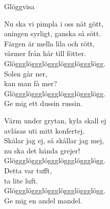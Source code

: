 \begin{song}{Glöggvisa}

    
	
	Nu ska vi pimpla i oss nåt gött,\\
	aningen syrligt, ganska så sött.\\
	Färgen är mella lila och rött,\\
	värmer från hår till fötter.\\
	Glöggglöggglöggglöggglöggglögg.\\
	Solen går ner,\\
	kan man få mer?\\
	Glöggglöggglöggglöggglöggglögg.\\
	Ge mig ett dussin russin.

	Värm under grytan, kyla skall ej\\
	avläsas uti mitt konfertej.\\
	Skålar jag ej, så skållar jag mej,\\
	nu ska det hända grejer!\\
	Glöggglöggglöggglöggglöggglögg.\\
	Detta var tufft,\\
	ta lite luft.\\
	Glöggglöggglöggglöggglöggglögg.\\
	Ge mig en andel mandel.

	
\end{song}
